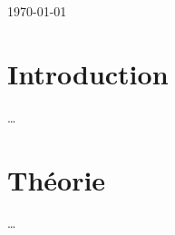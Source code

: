 \documentclass[letterpaper,12pt,oneside]{article}
\begin{document}
\begin{titlepage}


{\large \today}\\[3cm] %


 


\end{titlepage}


\tableofcontents
\listoffigures
\listoftables


\newpage

\setcounter{page}{1}


\setlength{\parindent}{15pt} %

\begin{abstract}
\dots
\end{abstract}

\section{Introduction}
\dots

\section{Théorie}
\dots
\end{document}
